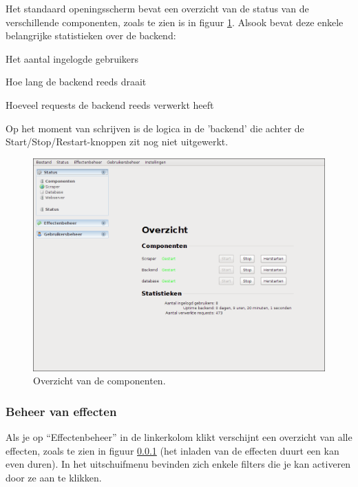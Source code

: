 Het standaard openingsscherm bevat een overzicht van de status van de verschillende componenten, zoals te zien is in figuur \ref{fig:handl:admin:status-overzicht}.
Alsook bevat deze enkele belangrijke statistieken over de backend:
\begin{enumerate_compact}
\item Het aantal ingelogde gebruikers
\item Hoe lang de backend reeds draait
\item Hoeveel requests de backend reeds verwerkt heeft
\end{enumerate_compact}
Op het moment van schrijven is de logica in de 'backend' die achter de Start/Stop/Restart-knoppen zit nog niet uitgewerkt.

\begin{figure}[h!]
	\centering
		\includegraphics[width=\textwidth]{images/handleiding/administratie/status-overzicht}
	\caption{Overzicht van de componenten.}
		\label{fig:handl:admin:status-overzicht}
\end{figure}

\subsubsection{Beheer van effecten}
\label{sec:handl:admin:effecten}

Als je op ``Effectenbeheer'' in de linkerkolom klikt verschijnt een overzicht van alle effecten, zoals te zien in figuur \ref{sec:handl:admin:effecten} (het inladen van de effecten duurt een kan even duren).
In het uitschuifmenu bevinden zich enkele filters die je kan activeren door ze aan te klikken.

